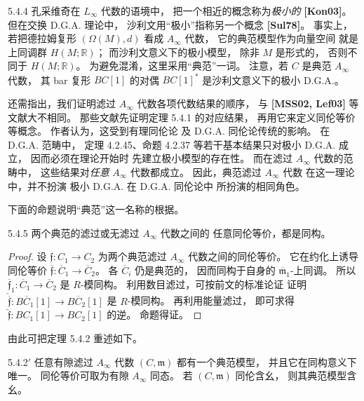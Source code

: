 \begin{remark}{5.4.4}\label{rem:5-4-4}
孔采维奇在 $L_\infty$ 代数的语境中，
把一个相近的概念称为\emph{极小的}
\textbf{[Kon03]}。
但在交换 D.G.A. 理论中，
沙利文用“极小”指称另一个概念
\textbf{[Sul78]}。
事实上，若把德拉姆复形
$(\Omega(M),d)$
看成 $A_\infty$ 代数，
它的典范模型作为向量空间
就是上同调群 $H(M;\mathbb R)$；
而沙利文意义下的极小模型，
除非 $M$ 是形式的，
否则不同于 $H(M;\mathbb R)$。
为避免混淆，这里采用“典范”一词。
注意，若 $C$ 是典范 $A_\infty$ 代数，
其 bar 复形 $BC[1]$
的对偶 $BC[1]^*$
是沙利文意义下的极小 D.G.A.。

还需指出，我们证明滤过 $A_\infty$
代数各项代数结果的顺序，
与 \textbf{[MSS02, Lef03]}
等文献大不相同。
那些文献先证明定理 5.4.1 的对应结果，
再用它来定义同伦等价等概念。
作者认为，这受到有理同伦论
及 D.G.A. 同伦论传统的影响。
在 D.G.A. 范畴中，
定理 4.2.45、命题 4.2.37
等若干基本结果只对极小 D.G.A. 成立，
因而必须在理论开始时
先建立极小模型的存在性。
而在滤过 $A_\infty$ 代数的范畴中，
这些结果对\emph{任意}
$A_\infty$ 代数都成立。
因此，典范滤过 $A_\infty$ 代数
在这一理论中，并不扮演
极小 D.G.A. 在 D.G.A. 同伦论中
所扮演的相同角色。
\end{remark}

下面的命题说明“典范”这一名称的根据。

\begin{proposition}{5.4.5}\label{prop:5-4-5}
两个典范的滤过或无滤过
$A_\infty$ 代数之间的
任意同伦等价，都是同构。
\end{proposition}

\begin{proof}
设 $\mathfrak f\colon C_1\to C_2$
为两个典范滤过 $A_\infty$
代数之间的同伦等价。
它在约化上诱导同伦等价
$\overline{\mathfrak f}\colon
\overline C_1\to\overline C_2$。
各 $\overline C_i$ 仍是典范的，
因而同构于自身的
$\overline{\mathfrak m}_1$-上同调。
所以
$\overline{\mathfrak f}_1\colon
\overline C_1\to\overline C_2$
是 $R$-模同构。
利用数目滤过，可按前文的标准论证
证明
$\widehat{\overline{\mathfrak f}}\colon
B\overline C_1[1]\to
B\overline C_2[1]$
是 $R$-模同构。
再利用能量滤过，
即可求得
$\widehat{\mathfrak f}\colon
BC_1[1]\to BC_2[1]$
的逆。
命题得证。
\end{proof}

由此可把定理 5.4.2 重述如下。

\begin{theorem}{5.4.2$'$}\label{thm:5-4-2-prime}
任意有隙滤过 $A_\infty$ 代数
$(C,\mathfrak m)$
都有一个典范模型，
并且它在同构意义下唯一。
同伦等价可取为有隙
$A_\infty$ 同态。
若 $(C,\mathfrak m)$ 同伦含幺，
则其典范模型含幺。
\end{theorem}

